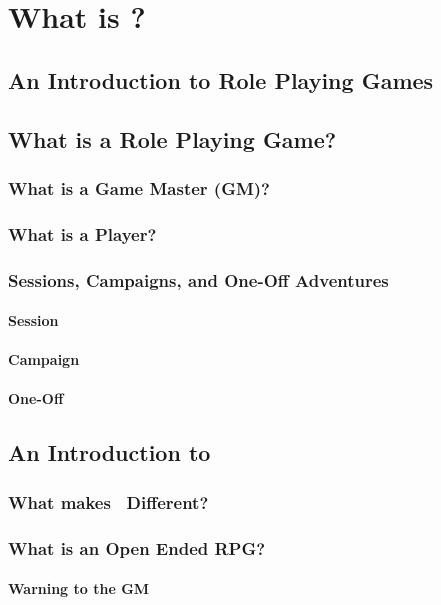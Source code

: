 \part{What is {\slshape\gametitle}?}

\chapter{An Introduction to Role Playing Games}

\chapter{What is a Role Playing Game?}

\section{What is a Game Master (GM)?}

\section{What is a Player?}

\section{Sessions, Campaigns, and One-Off Adventures}

\subsection{Session}

\subsection{Campaign}

\subsection{One-Off}

\chapter{An Introduction to {\slshape\gametitle}}

\section{What makes \gametitle\ Different?}

\section{What is an Open Ended RPG?}

\subsection{Warning to the GM}
